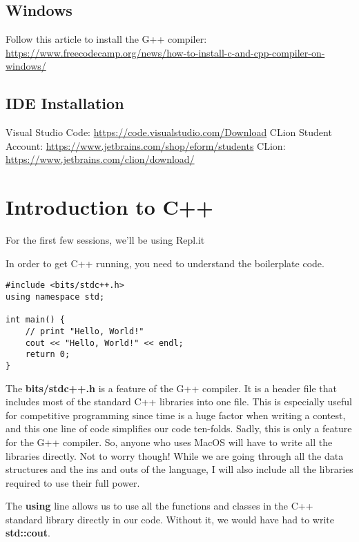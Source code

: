 \documentclass{report}
\begin{document}
\subsection*{Windows}
Follow this article to install the G++ compiler: \url{https://www.freecodecamp.org/news/how-to-install-c-and-cpp-compiler-on-windows/}

\subsection*{IDE Installation}
Visual Studio Code: \url{https://code.visualstudio.com/Download}\newline
CLion Student Account: \url{https://www.jetbrains.com/shop/eform/students}\newline
CLion: \url{https://www.jetbrains.com/clion/download/} 

\newpage
\section{Introduction to C++}
\begin{note}
    For the first few sessions, we'll be using Repl.it
\end{note}

In order to get C++ running, you need to understand the boilerplate code.

\begin{lstlisting}[caption=Basic C++ Syntax]
#include <bits/stdc++.h>
using namespace std;

int main() {
    // print "Hello, World!"
    cout << "Hello, World!" << endl;
    return 0;
}
\end{lstlisting}

The \textbf{bits/stdc++.h} is a feature of the G++ compiler. It is a header file that includes most of the standard C++ libraries into one file. This is especially useful for competitive programming since time is a huge factor when writing a contest, and this one line of code simplifies our code ten-folds. Sadly, this is only a feature for the G++ compiler. So, anyone who uses MacOS will have to write all the libraries directly. Not to worry though! While we are going through all the data structures and the ins and outs of the language, I will also include all the libraries required to use their full power.

The \textbf{using} line allows us to use all the functions and classes in the C++ standard library directly in our code. Without it, we would have had to write \textbf{std::cout}. 
\end{document}
